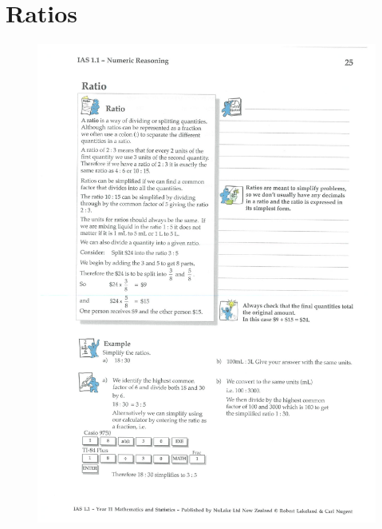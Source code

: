 \documentclass[a4paper,12pt]{article}
\begin{document}
\section{Ratios}
\begin{figure}[!h]
	\centering
	\includegraphics[width=17cm]{Nulake_year10_forextension_ratio1}
\end{figure}
\end{document}
